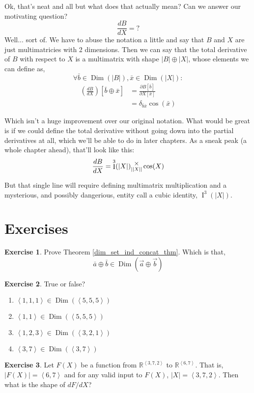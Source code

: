 \documentclass[12pt]{book}
\theoremstyle{definition}
\newtheorem{exercise}{Exercise}[chapter]
\theoremstyle{plain}
\theoremstyle{ppart}
\theoremstyle{case}
\theoremstyle{solution}
\DeclareMathOperator{\Dim}{Dim}
\DeclareMathOperator{\Ident}{I}
\newcommand{\mmult}[1]{\text{\raisebox{1ex}{$\underset{#1}{\times}$}}}
\begin{document}
Ok, that's neat and all but what does that actually mean? Can we answer our motivating 
question?
\[\frac{dB}{dX} = ? \]
Well... sort of. We have to abuse the notation a little and say that $B$ and $X$ are
just multimatricies with 2 dimensions. Then we can say that the total derivative
of $B$ with respect to $X$ is a multimatrix with shape $|B| \oplus |X|$,
whose elements we can define as,
\[\forall \bar{b} \in \Dim(|B|), \bar{x} \in \Dim(|X|):\]
\begin{align*}
\left( \frac{dB}{dX} \right)[\bar{b} \oplus \bar{x}]
&= \frac{\partial B[\bar{b}]}{\partial X[\bar{x}]} \\
&= \delta_{\bar{b}\bar{x}}\cos(\bar{x})
\end{align*}

Which isn't a huge improvement over our original notation. What would be great is
if we could define the total derivative without going down into the partial derivatives
at all, which we'll be able to do in later chapters. As a sneak peak (a whole
chapter ahead), that'll look like this:
\[
\frac{dB}{dX} = \Ident^3(|X|) \mmult{||X||} \cos(X)
\]

But that single line will require defining multimatrix multiplication and
a mysterious, and possibly dangerious, entity call a cubic identity, $\Ident^3(|X|)$.

\section{Exercises}

\begin{exercise}
\label{dim_set_ind_concat_ex}
Prove Theorem \ref{dim_set_ind_concat_thm}. Which is that,
\[ \bar{a} \oplus \bar{b} \in \Dim(\vec{a} \oplus \vec{b}) \]
\end{exercise}

\begin{exercise}
True or false?
\begin{enumerate}
\item $\left<1,1,1\right> \in \Dim(\left<5,5,5\right>)$
\item $\left<1,1\right> \in \Dim(\left<5,5,5\right>)$
\item $\left<1,2,3\right> \in \Dim(\left<3,2,1\right>)$
\item $\left<3,7\right> \in \Dim(\left<3,7\right>)$
\end{enumerate}
\end{exercise}

\begin{exercise}
Let $F(X)$ be a function from $\mathbb{R}^{\left<3,7,2\right>}$ to
$\mathbb{R}^{\left<6, 7\right>}$. That is, $|F(X)| = \left<6,7\right>$
and for any valid input to $F(X)$, $|X| = \left<3,7,2\right>$.
Then what is the shape of $dF/dX$?
\end{exercise}
\end{document}
